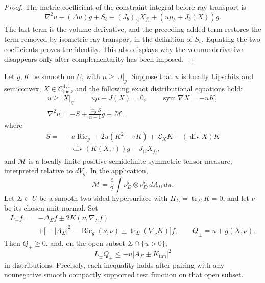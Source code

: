 \begin{proof}
The metric coefficient of the constraint integral before ray
transport is
\[
 \nabla^2u-(\Delta u)g+S_b+(J_b)_{(i}X_{j)}
                   +(u\mu_b+J_b(X))g.
\]
The last term is the volume derivative, and the preceding added term
restores the term removed by isometric ray transport in the
definition of $S_b$.  Equating the two coefficients proves the
identity.  This also displays why the volume derivative disappears
only after complementarity has been imposed.
\end{proof}

\begin{lemma}
\label{lem:variation:measure-focusing}
Let $g,K$ be smooth on $U$, with $\mu\geq|J|_g$.  Suppose that $u$ is
locally Lipschitz and semiconvex, $X\in C^{1,1}_{\mathrm{loc}}$, and
the following exact distributional equations hold:
\[
 \begin{gathered}
 u\geq|X|_g,\qquad u\mu+J(X)=0,\qquad
 \operatorname{sym}\nabla X=-uK,\\
 \nabla^2u=-S+\frac{\operatorname{tr}_gS}{n-1}g+\mathcal M,
 \end{gathered}
\]
where
\[
 \begin{split}
 S={}&-u\operatorname{Ric}_g+2u(K^2-\tau K)
        +\mathcal L_XK-(\operatorname{div}X)K\\
     &-\operatorname{div}(K(X,\cdot))g-J_{(i}X_{j)},
 \end{split}
\]
and $\mathcal M$ is a locally finite positive semidefinite symmetric
tensor measure, interpreted relative to $dV_g$.  In the application,
\[
 \mathcal M=\frac c2\int\nu_D^\flat\otimes\nu_D^\flat\,dA_D\,d\pi.
\]
Let $\Sigma\subset U$ be a smooth two-sided hypersurface with
$H_\Sigma=\operatorname{tr}_\Sigma K=0$, and let $\nu$ be its chosen
unit normal.  Set
\[
 \begin{split}
 L_\pm f={}&-\Delta_\Sigma f
        \pm2K(\nu,\nabla_\Sigma f)\\
 &+\bigl[-|A_\Sigma|^2-\operatorname{Ric}_g(\nu,\nu)
                 \pm\operatorname{tr}_\Sigma(\nabla_\nu K)\bigr]f,
 \qquad Q_\pm=u\mp g(X,\nu).
 \end{split}
\]
Then $Q_\pm\geq0$, and, on the open subset $\Sigma\cap\{u>0\}$,
\[
 L_\pm Q_\pm\leq-u|A_\Sigma\pm K_{\mathrm{tan}}|^2
\]
in distributions.  Precisely, each inequality holds after pairing
with any nonnegative smooth compactly supported test function on
that open subset.
\end{lemma}

